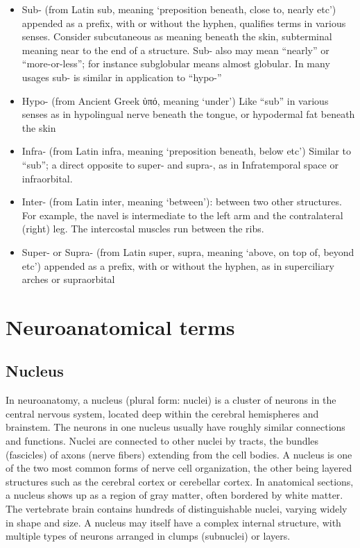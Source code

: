 \documentclass[]{book}
\providecommand{\tightlist}{%
  \setlength{\itemsep}{0pt}\setlength{\parskip}{0pt}}
\begin{document}
\begin{itemize}
\tightlist
\item
  Sub- (from Latin sub, meaning `preposition beneath, close to, nearly etc') appended as a prefix, with or without the hyphen, qualifies terms in various senses. Consider subcutaneous as meaning beneath the skin, subterminal meaning near to the end of a structure. Sub- also may mean ``nearly'' or ``more-or-less''; for instance subglobular means almost globular. In many usages sub- is similar in application to ``hypo-''
\item
  Hypo- (from Ancient Greek ὑπό, meaning `under') Like ``sub'' in various senses as in hypolingual nerve beneath the tongue, or hypodermal fat beneath the skin
\item
  Infra- (from Latin infra, meaning `preposition beneath, below etc') Similar to ``sub''; a direct opposite to super- and supra-, as in Infratemporal space or infraorbital.
\item
  Inter- (from Latin inter, meaning `between'): between two other structures. For example, the navel is intermediate to the left arm and the contralateral (right) leg. The intercostal muscles run between the ribs.
\item
  Super- or Supra- (from Latin super, supra, meaning `above, on top of, beyond etc') appended as a prefix, with or without the hyphen, as in superciliary arches or supraorbital
\end{itemize}

\hypertarget{neuroanatomical-terms}{%
\chapter{Neuroanatomical terms}\label{neuroanatomical-terms}}

\hypertarget{nucleus}{%
\section{Nucleus}\label{nucleus}}

In neuroanatomy, a nucleus (plural form: nuclei) is a cluster of neurons in the central nervous system, located deep within the cerebral hemispheres and brainstem. The neurons in one nucleus usually have roughly similar connections and functions. Nuclei are connected to other nuclei by tracts, the bundles (fascicles) of axons (nerve fibers) extending from the cell bodies. A nucleus is one of the two most common forms of nerve cell organization, the other being layered structures such as the cerebral cortex or cerebellar cortex. In anatomical sections, a nucleus shows up as a region of gray matter, often bordered by white matter. The vertebrate brain contains hundreds of distinguishable nuclei, varying widely in shape and size. A nucleus may itself have a complex internal structure, with multiple types of neurons arranged in clumps (subnuclei) or layers.
\end{document}
